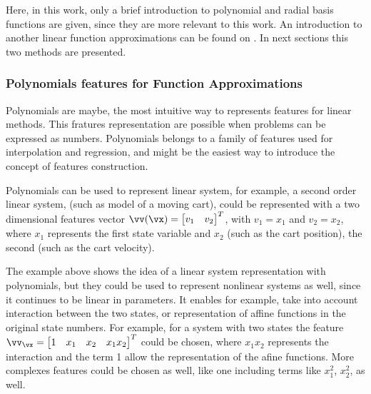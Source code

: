 
Here, in this work, only a brief introduction to polynomial and radial basis functions are given, since they are more relevant to this work. An introduction to another linear function approximations can be found on \citet{sutton2018}. In next sections this two methods are presented.

\subsubsection{Polynomials features for Function Approximations}
\label{sec:polynomial}

Polynomials are maybe, the most intuitive way to represents features for linear methods. This fratures representation are possible when problems can be expressed as numbers. Polynomials belongs to a family of features used for interpolation and regression, and might be the easiest way to introduce the concept of features construction.

Polynomials can be used to represent linear system, for example, a second order linear system, (such as model of a moving cart), could be represented with a two dimensional features vector $\vv(\vx) = \begin{bmatrix} v_1 & v_2 \end{bmatrix}^T $, with $ v_1 = x_1$ and $ v_2=x_2$, where $ x_1$ represents the first state variable and $ x_2$ (such as the cart position), the second (such as the cart velocity).

The example above shows the idea of a linear system representation with polynomials, but they could be used to represent nonlinear systems as well, since it continues to be linear in parameters. It enables for example, take into account interaction between the two states, or representation of affine functions in the original state numbers. For example, for a system with two states the feature $\vv_{\vx} = \begin{bmatrix} 1 & x_1 & x_2 & x_1x_2 \end{bmatrix}^T$ could be chosen, where $ x_1x_2$ represents the interaction and the term 1 allow the representation of the afine functions. More complexes features could be chosen as well, like one including terms like $ x_1^2$, $ x_2^2$, as well.

